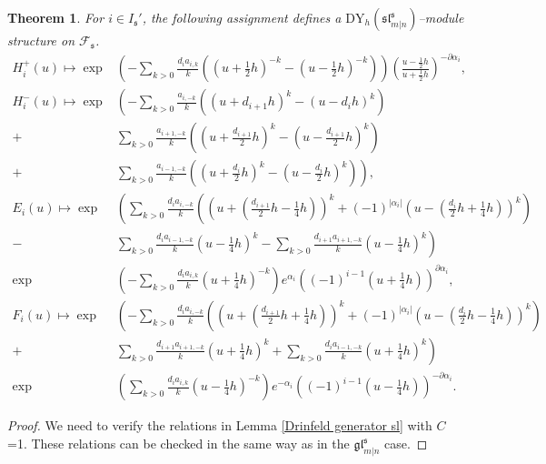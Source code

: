 \documentclass[a4paper,12pt]{article}
\newtheorem{theo}{{Theorem}}[section]
\numberwithin{equation}{section}
\begin{document}
\begin{theo}\label{Vertex sl}
For $i \in I_{\mathfrak{s}}'$, the following assignment defines a $\mathrm{DY}_{h}(\mathfrak{sl}^{\mathfrak{s}}_{m|n})$--module structure on $\mathcal{F}_{\mathfrak{s}}$. 
\begin{align*}
H_{i}^{+}(u)\mapsto \exp &\left(-\sum_{k>0}
\frac{d_{i}a_{i,k}}{k}\left(\left(u+\frac{1}{2}h\right)^{-k}-\left(u-\frac{1}{2}h
\right)^{-k}\right)\right)\left(\frac{u-\frac{1}{2}h}{u+\frac{1}{2}h}\right)^{-\partial \alpha_{i}},\\
H_{i}^{-}(u)\mapsto \exp &\left(-\sum_{k>0}\frac{a_{i,-k}}{k}\left(\left(u+d_{i+1}h\right)^{k}-
\left(u-d_{i}h\right)^{k}\right)\right.\\
+&\left.\sum_{k>0}\frac{a_{i+1,-k}}{k}\left(\left(u+\frac{d_{i+1}}{2}h\right)^{k}-
\left(u-\frac{d_{i+1}}{2}h\right)^{k}\right)\right.\\
+&\left.\sum_{k>0}\frac{a_{i-1,-k}}{k}\left(\left(u+\frac{d_{i}}{2}h\right)^{k}-
\left(u-\frac{d_{i}}{2}h\right)^{k}\right)\right),\\
E_{i}(u)\mapsto \exp &\left(\sum_{k>0}
\frac{d_{i}a_{i,-k}}{k}\left(\left(u+\left(\frac{d_{i+1}}{2}h
-\frac{1}{4}h\right)\right)^{k}+(-1)^{|\alpha_{i}|}\left(u-\left(\frac{d_{i}}{2}h
+\frac{1}{4}h\right)\right)^{k}\right)\right.\\
-&\left.\sum_{k>0}\frac{d_{i}a_{i-1,-k}}{k}\left(u-\frac{1}{4}h\right)^{k}-
\sum_{k>0}\frac{d_{i+1}a_{i+1,-k}}{k}\left(u-\frac{1}{4}h\right)^{k}\right)\\
\exp &\left(-\sum_{k>0}\frac{d_{i}a_{i,k}}{k}
\left(u+\frac{1}{4}h\right)^{-k}\right)e^{ \alpha_{i}}\left((-1)^{i-1}\left(u+\frac{1}{4}h\right)\right)^{\partial \alpha_{i}},\\
F_{i}(u)\mapsto \exp &\left(-\sum_{k>0}\frac{d_{i}a_{i,-k}}{k}
\left(\left(u+\left(\frac{d_{i+1}}{2}h+\frac{1}{4}h\right)\right)^{k}+(-1)^{|\alpha_{i}|}
\left(u-\left(\frac{d_{i}}{2}h-\frac{1}{4}h\right)\right)^{k}\right)\right.\\
+&\left.\sum_{k>0}\frac{d_{i+1}a_{i+1,-k}}{k}\left(u+\frac{1}{4}h\right)^{k}+
\sum_{k>0}\frac{d_{i}a_{i-1,-k}}{k}\left(u+\frac{1}{4}h\right)^{k}\right)\\
\exp &\left(\sum_{k>0}\frac{d_{i}a_{i,k}}{k}
\left(u-\frac{1}{4}h\right)^{-k}\right)e^{-\alpha_{i}}\left((-1)^{i-1}\left(u-
\frac{1}{4}h\right)\right)^{-\partial \alpha_{i}}.
\end{align*}
\end{theo}
\begin{proof} 
We need to verify the relations in Lemma \ref{Drinfeld generator sl} with $C$=1. These relations can be checked in the same way as in the $\mathfrak{gl}_{m|n}^{\mathfrak{s}}$ case.
\end{proof}
\end{document}
